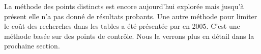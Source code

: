 
		La méthode des points distincts est encore aujourd'hui explorée mais jusqu'à présent elle n'a pas donné de résultats probants. Une autre méthode pour limiter le coût des recherches dans les tables a été présentée par \cite{checkpoints} en 2005. C'est une méthode basée sur des points de contrôle. Nous la verrons plus en détail dans la prochaine section.

\endinput{}
